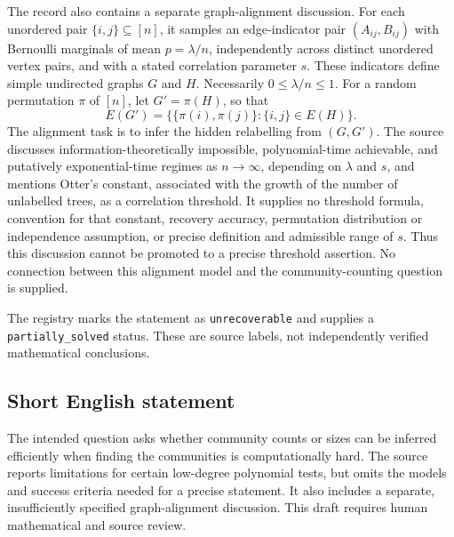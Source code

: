 \documentclass[11pt]{article}
\begin{document}
The record also contains a separate graph-alignment discussion. For each unordered pair \(\{i,j\}\subseteq[n]\), it samples an edge-indicator pair \((A_{ij},B_{ij})\) with Bernoulli marginals of mean \(p=\lambda/n\), independently across distinct unordered vertex pairs, and with a stated correlation parameter \(s\). These indicators define simple undirected graphs \(G\) and \(H\). Necessarily \(0\leq\lambda/n\leq1\). For a random permutation \(\pi\) of \([n]\), let \(G'=\pi(H)\), so that
\[
E(G')=\bigl\{\{\pi(i),\pi(j)\}:\{i,j\}\in E(H)\bigr\}.
\]
The alignment task is to infer the hidden relabelling from \((G,G')\). The source discusses information-theoretically impossible, polynomial-time achievable, and putatively exponential-time regimes as \(n\to\infty\), depending on \(\lambda\) and \(s\), and mentions Otter's constant, associated with the growth of the number of unlabelled trees, as a correlation threshold. It supplies no threshold formula, convention for that constant, recovery accuracy, permutation distribution or independence assumption, or precise definition and admissible range of \(s\). Thus this discussion cannot be promoted to a precise threshold assertion. No connection between this alignment model and the community-counting question is supplied.

The registry marks the statement as \texttt{unrecoverable} and supplies a \texttt{partially\_solved} status. These are source labels, not independently verified mathematical conclusions.
\subsection{Short English statement}
The intended question asks whether community counts or sizes can be inferred efficiently when finding the communities is computationally hard. The source reports limitations for certain low-degree polynomial tests, but omits the models and success criteria needed for a precise statement. It also includes a separate, insufficiently specified graph-alignment discussion. This draft requires human mathematical and source review.
\end{document}
